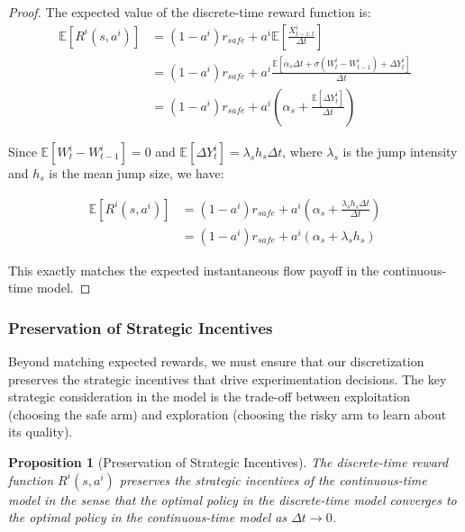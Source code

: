 \documentclass[a4paper,12pt]{report}
\newtheorem{proposition}{Proposition}
\begin{document}
\begin{proof}
    The expected value of the discrete-time reward function is:
    \begin{align}
        \mathbb{E}[R^i(s, a^i)] & = (1-a^i)r_\textit{safe} + a^i\mathbb{E}\left[\frac{X^i_{t-1:t}}{\Delta t}\right]                                       \\
                                & = (1-a^i)r_\textit{safe} + a^i\frac{\mathbb{E}[\alpha_s \Delta t + \sigma(W^i_t - W^i_{t-1}) + \Delta Y^i_t]}{\Delta t} \\
                                & = (1-a^i)r_\textit{safe} + a^i\left(\alpha_s + \frac{\mathbb{E}[\Delta Y^i_t]}{\Delta t}\right)
    \end{align}

    Since $\mathbb{E}[W^i_t - W^i_{t-1}] = 0$ and $\mathbb{E}[\Delta Y^i_t] = \lambda_s h_s\Delta t$, where $\lambda_s$ is the jump intensity and $h_s$ is the mean jump size, we have:

    \begin{align}
        \mathbb{E}[R^i(s, a^i)] & = (1-a^i)r_\textit{safe} + a^i\left(\alpha_s + \frac{\lambda_s h_s\Delta t}{\Delta t}\right) \\
                                & = (1-a^i)r_\textit{safe} + a^i(\alpha_s + \lambda_s h_s)
    \end{align}

    This exactly matches the expected instantaneous flow payoff in the continuous-time model.
\end{proof}


\iffalse
    \subsubsection{Preservation of Strategic Incentives}
    \label{appendix:strategic_incentives}

    Beyond matching expected rewards, we must ensure that our discretization preserves the strategic incentives that drive experimentation decisions. The key strategic consideration in the model is the trade-off between exploitation (choosing the safe arm) and exploration (choosing the risky arm to learn about its quality).

    \begin{proposition}[Preservation of Strategic Incentives]
        The discrete-time reward function $R^i(s, a^i)$ preserves the strategic incentives of the continuous-time model in the sense that the optimal policy in the discrete-time model converges to the optimal policy in the continuous-time model as $\Delta t \to 0$.

    \end{proposition}
\end{document}
